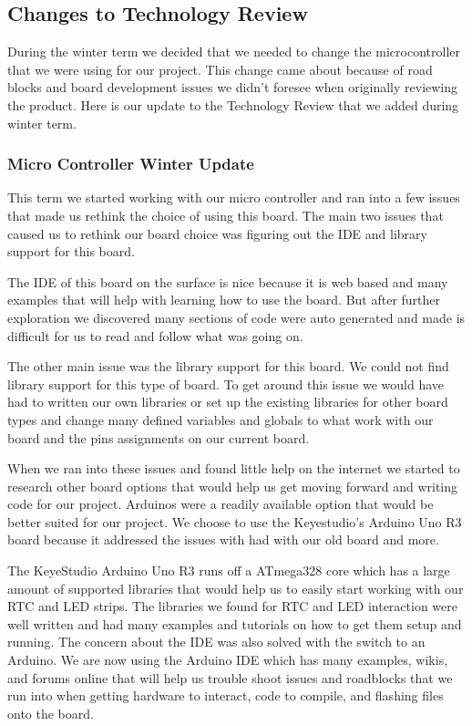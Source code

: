 \documentclass[onecolumn, draftclsnofoot,10pt, compsoc]{IEEEtran}
\begin{document}
\subsection{Changes to Technology Review}
During the winter term we decided that we needed to change the microcontroller that we were using for our project.
This change came about because of road blocks and board development issues we didn't foresee when originally reviewing the product.
Here is our update to the Technology Review that we added during winter term.
\subsubsection{Micro Controller Winter Update}
This term we started working with our micro controller and ran into a few issues that made us rethink the choice of using this board. The main two issues that caused us to rethink our board choice was figuring out the IDE and library support for this board.

The IDE of this board on the surface is nice because it is web based and many examples that will help with learning how to use the board. But after further exploration we discovered many sections of code were auto generated and made is difficult for us to read and follow what was going on.

The other main issue was the library support for this board. We could not find library support for this type of board. To get around this issue we would have had to written our own libraries or set up the existing libraries for other board types and change many defined variables and globals to what work with our board and the pins assignments on our current board.

When we ran into these issues and found little help on the internet we started to research other board options that would help us get moving forward and writing code for our project. Arduinos were a readily available option that would be better suited for our project. We choose to use the Keyestudio's Arduino Uno R3 board because it addressed the issues with had with our old board and more.

The KeyeStudio Arduino Uno R3 runs off a ATmega328 core which has a large amount of supported libraries that would help us to easily start working with our RTC and LED strips. The libraries we found for RTC and LED interaction were well written and had many examples and tutorials on how to get them setup and running. The concern about the IDE was also solved with the switch to an Arduino. We are now using the Arduino IDE which has many examples, wikis, and forums online that will help us trouble shoot issues and roadblocks that we run into when getting hardware to interact, code to compile, and flashing files onto the board.
\end{document}
